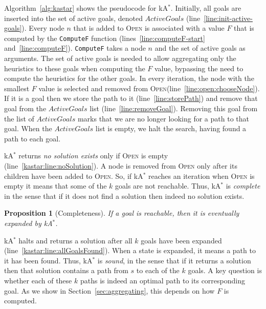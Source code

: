 \documentclass[twoside,11pt]{article}
\newtheorem{proposition}[theorem]{Proposition}
\newcommand{\astar}{A$^*$\xspace}
\newcommand{\kastar}{kA$^*$\xspace}
\newcommand{\open}{\textsc{Open}\xspace}
\begin{document}
Algorithm~\ref{alg:kastar} shows the pseudocode for \kastar. 
Initially, all goals are inserted into the set of active goals, denoted  $\mathit{ActiveGoals}$ (line~\ref{line:init-active-goals}).
Every node $n$ that is added to \open is associated with a value $F$ that is computed by the \texttt{ComputeF} function (lines~\ref{line:computeF-start} and~\ref{line:computeF}).
\texttt{ComputeF} takes a node $n$ and the set of active goals as arguments. 
The set of active goals is needed to allow aggregating only the heuristics to these goals when computing the $F$ value, bypassing the need to compute the heuristics for the other goals. 
In every iteration, the node with the smallest $F$ value is selected and removed from \open (line~\ref{line:open:chooseNode}).
If it is a goal then we store the path to it (line~\ref{line:storePath}) and remove that goal from the $\mathit{ActiveGoals}$ list (line~\ref{line:removeGoal}).
Removing this goal from the list of $\mathit{ActiveGoals}$ marks that we are no longer looking for a path to that goal.
When the $\mathit{ActiveGoals}$ list is empty, we halt the search, having found a path to each goal.


\kastar returns \emph{no solution exists} only if \open is empty (line~\ref{kastar:line:noSolution}).
A node is removed from \open only after its children have been added to \open.
So, if \kastar reaches an iteration when \open is empty it means that some of the $k$ goals are not reachable.
Thus, \kastar is \emph{complete} in the sense that if it does not find a solution then indeed no solution exists.

\begin{proposition}[Completeness]
  \label{prop:completeness}
  If a goal is reachable, then it is eventually expanded by \kastar. 
\end{proposition}

\kastar halts and returns a solution after all $k$ goals have been expanded (line~\ref{kastar:line:allGoalsFound}).
When a state is expanded, it means a path to it has been found.
Thus, \kastar is \emph{sound}, in the sense that if it returns a solution then that solution contains a path from $s$ to each of the $k$ goals.
A key question is whether each of these $k$ paths is indeed an optimal path to its corresponding goal.
As we show in Section~\ref{sec:aggregating}, this depends on how $F$ is computed. %
\end{document}

